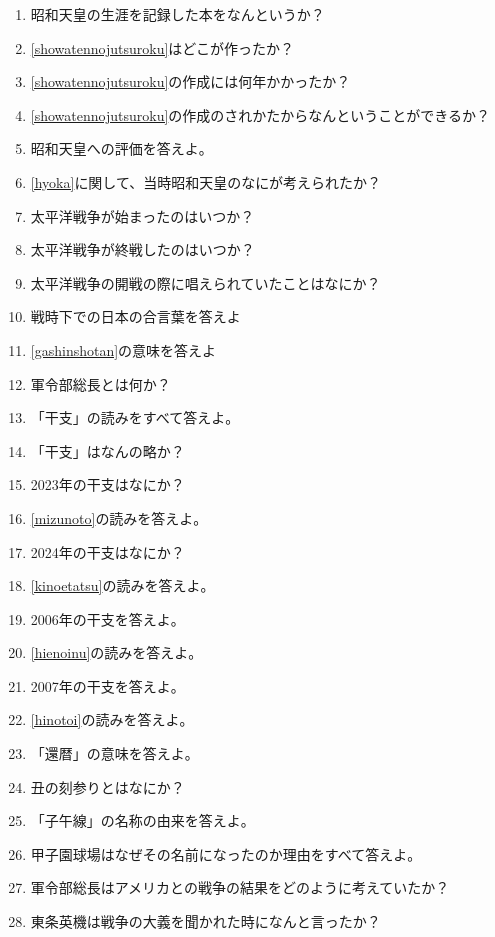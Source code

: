 \documentclass[]{jsarticle}
\begin{document}
\begin{enumerate}
		\\
	\item 昭和天皇の生涯を記録した本をなんというか？\label{showatennojutsuroku}
	\item \ref{showatennojutsuroku}はどこが作ったか？
	\item \ref{showatennojutsuroku}の作成には何年かかったか？
	\item \ref{showatennojutsuroku}の作成のされかたからなんということができるか？
	\item 昭和天皇への評価を答えよ。\label{hyoka}
	\item \ref{hyoka}に関して、当時昭和天皇のなにが考えられたか？
	\item 太平洋戦争が始まったのはいつか？
	\item 太平洋戦争が終戦したのはいつか？
	\item 太平洋戦争の開戦の際に唱えられていたことはなにか？
	\item 戦時下での日本の合言葉を答えよ\label{gashinshotan}
	\item \ref{gashinshotan}の意味を答えよ
	\item 軍令部総長とは何か？
		\\
	\item 「干支」の読みをすべて答えよ。
	\item 「干支」はなんの略か？\
	\item 2023年の干支はなにか？\label{mizunoto}
	\item \ref{mizunoto}の読みを答えよ。
	\item 2024年の干支はなにか？\label{kinoetatsu}
	\item \ref{kinoetatsu}の読みを答えよ。
	\item 2006年の干支を答えよ。\label{hienoinu}
	\item \ref{hienoinu}の読みを答えよ。
	\item 2007年の干支を答えよ。\label{hinotoi}
	\item \ref{hinotoi}の読みを答えよ。
	\item 「還暦」の意味を答えよ。
	\item 丑の刻参りとはなにか？
	\item 「子午線」の名称の由来を答えよ。
	\item 甲子園球場はなぜその名前になったのか理由をすべて答えよ。
		\\
	\item 軍令部総長はアメリカとの戦争の結果をどのように考えていたか？
	\item 東条英機は戦争の大義を聞かれた時になんと言ったか？

\end{enumerate}
\end{document}
